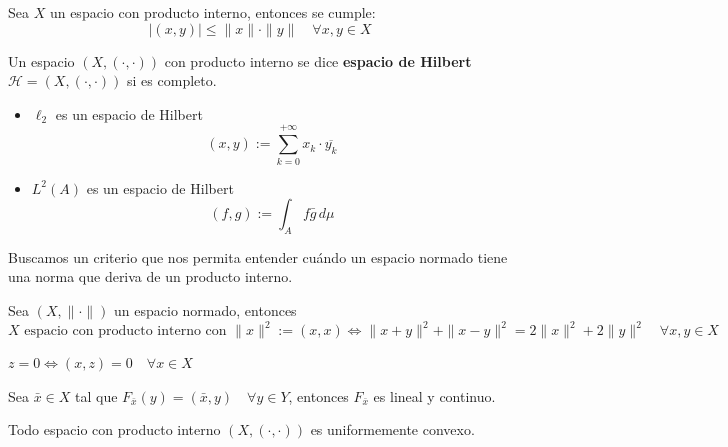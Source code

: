 \documentclass[12pt]{book}
\begin{document}
\begin{prop}
    Sea $X$ un espacio con producto interno, entonces se cumple:
    \[ |(x, y)| \le \|x\| \cdot \|y\| \quad \forall x, y \in X \]
\end{prop}

\begin{definicion}
    Un espacio $(X, (\cdot, \cdot))$ con producto interno se dice \textbf{espacio de Hilbert} \mbox{$\mathcal{H} = (X, (\cdot, \cdot))$} si es completo.
\end{definicion}

\begin{ejemplo}
    \begin{itemize}
        \item $\ell_2$ es un espacio de Hilbert
        $$(x, y) := \sum_{k=0}^{+\infty} x_k \cdot \overline{y_k}$$
        \item $L^2(A)$ es un espacio de Hilbert
        $$(f, g) := \int_A f \bar{g} \, d\mu$$
    \end{itemize}
\end{ejemplo}


\noindent
Buscamos un criterio que nos permita entender cuándo un espacio normado tiene una norma que deriva de un producto interno.

\begin{teo}\label{teo:paralelogramo}
    Sea $(X, \|\cdot\|)$ un espacio normado, entonces
    \begin{equation*}
        X \text{ espacio con producto interno con } \|x\|^2 := (x, x) \iff \|x+y\|^2 + \|x-y\|^2 = 2\|x\|^2 + 2\|y\|^2 \quad \forall x, y \in X
    \end{equation*}
\end{teo}

\begin{prop}
    $z = 0 \iff (x, z) = 0 \quad \forall x \in X$\\
\end{prop}

\begin{observacion}
    Sea $\bar{x}\in X$ tal que $F_{\bar{x}}(y) = (\bar{x}, y) \quad \forall y \in Y$, entonces $F_{\bar{x}}$ es lineal y continuo.
\end{observacion}


\begin{teo}
    Todo espacio con producto interno $(X, (\cdot, \cdot))$ es uniformemente convexo. \\
\end{teo}
\end{document}
